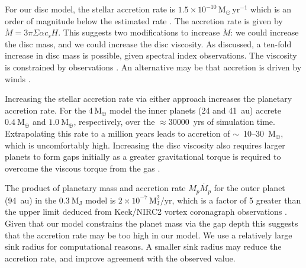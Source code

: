 \documentclass[usenatbib,a4paper,times]{mnras}
\renewcommand{\sun}{\mathrm{M}_{\odot}}
\renewcommand{\earth}{\mathrm{M}_{\oplus}}
\begin{document}
For our disc model, the stellar accretion rate is $1.5\times
10^{-10}\,\sun{}\,\mathrm{yr}^{-1}$ which is an order of magnitude below the
estimated rate \citep{brickhouse:2012}. The accretion rate is given by $\dot{M}
= 3\pi\Sigma\alpha c_s H$. This suggests two modifications to increase
$\dot{M}$: we could increase the disc mass, and we could increase the disc
viscosity. As discussed, a ten-fold increase in disc mass is possible, given
spectral index observations. The viscosity is constrained by observations
\citep{flaherty:2018}. An alternative may be that accretion is driven by winds
\citep{simon:2017a}.

Increasing the stellar accretion rate via either approach increases the
planetary accretion rate. For the 4$\,\earth{}$ model the inner planets (24 and
41~au) accrete $0.4~\earth{}$ and $1.0~\earth{}$, respectively, over the
$\approx30000$~yrs of simulation time. Extrapolating this rate to a million
years leads to accretion of $\sim$~10--30~$\earth{}$, which is uncomfortably
high. Increasing the disc viscosity also requires larger planets to form gaps
initially as a greater gravitational torque is required to overcome the viscous
torque from the gas \citep{dipierro:2016}.

The product of planetary mass and accretion rate $M_p\dot{M_p}$ for the outer
planet (94~au) in the $0.3~\mathrm{M_J}$ model is $2\times 10^{-7}\,
\mathrm{M_J^2/yr}$, which is a factor of 5 greater than the upper limit deduced
from Keck/NIRC2 vortex coronagraph observations \citep{ruane:2017}. Given that
our model constrains the planet mass via the gap depth this suggests that the
accretion rate may be too high in our model. We use a relatively large sink
radius for computational reasons. A smaller sink radius may reduce the accretion
rate, and improve agreement with the observed value.
\end{document}
